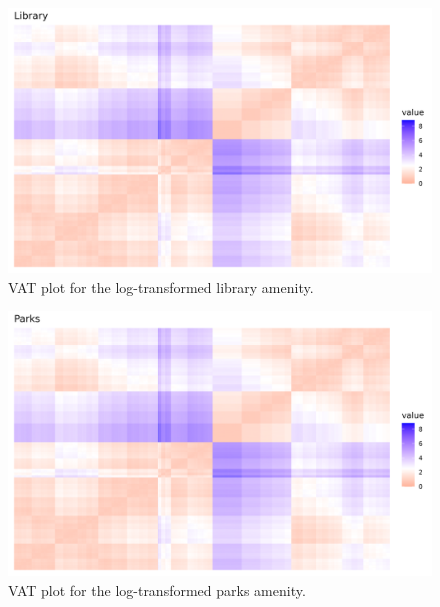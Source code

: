 \documentclass[11pt, a4paper]{article}
\begin{document}
\begin{figure}[H]
\centering
\includegraphics[width=\textwidth]{./vat/library_vat_log.png}
\caption[Library VAT plot]{VAT plot for the log-transformed library amenity.}\label{libraryvat}
\end{figure}








\begin{figure}[H]
\centering
\includegraphics[width=\textwidth]{./vat/parks_vat_log.png}
\caption[Parks VAT plot]{VAT plot for the log-transformed parks amenity.}\label{parksvat}
\end{figure}
\end{document}
